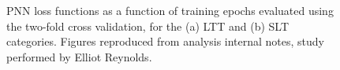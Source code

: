 \begin{figure}
  \centering
  \quad
  \quad
  \caption{PNN loss functions as a function of training epochs evaluated 
  using the two-fold cross validation, for the (a) LTT and (b) SLT categories.
  Figures reproduced from analysis internal notes, study performed by Elliot Reynolds. }
  \label{fig:overtrainingtestpnn}
\end{figure}










